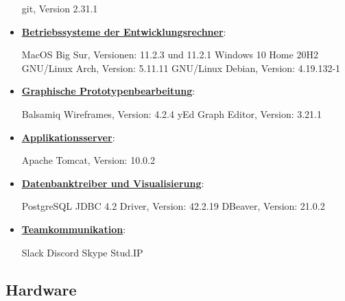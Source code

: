 \documentclass{article}
\begin{document}
\begin{itemize}
\begin{flushleft}
git, Version 2.31.1 \linebreak
\end{flushleft}
\item \underline{\textbf{Betriebssysteme der Entwicklungsrechner}}:
\begin{flushleft}
MacOS Big Sur, Versionen: 11.2.3 und 11.2.1 \linebreak
Windows 10 Home 20H2 \linebreak
GNU/Linux Arch, Version: 5.11.11 \linebreak
GNU/Linux Debian, Version: 4.19.132-1 \linebreak
\end{flushleft}
\item \underline{\textbf{Graphische Prototypenbearbeitung}}:
\begin{flushleft}
Balsamiq Wireframes, Version: 4.2.4 \linebreak 
yEd Graph Editor, Version: 3.21.1 \linebreak 
\end{flushleft}
\item \underline{\textbf{Applikationsserver}}: 
\begin{flushleft}
Apache Tomcat, Version: 10.0.2 \linebreak
\end{flushleft}
\item \underline{\textbf{Datenbanktreiber und Visualisierung}}: 
\begin{flushleft}
PostgreSQL JDBC 4.2 Driver, Version: 42.2.19 \linebreak
DBeaver, Version: 21.0.2
\end{flushleft}
\item \underline{\textbf{Teamkommunikation}}: 
\begin{flushleft}
Slack \linebreak
Discord \linebreak
Skype \linebreak
Stud.IP \linebreak
\end{flushleft}
\end{itemize}

\subsection{Hardware}
\end{document}
